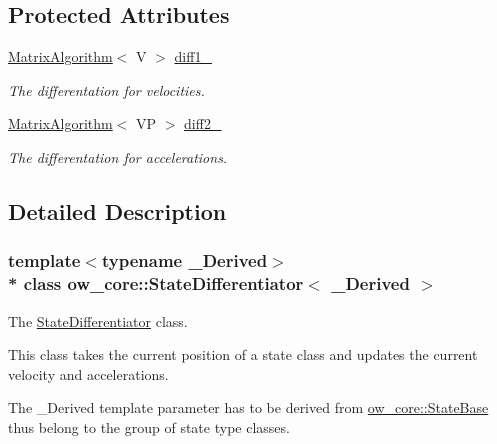 \subsection*{Protected Attributes}
\begin{DoxyCompactItemize}
\item 
\hyperlink{classow__core_1_1MatrixAlgorithm}{Matrix\+Algorithm}$<$ V $>$ \hyperlink{classow__core_1_1StateDifferentiator_ad428b0aed82b02f4db85574ede7be001}{diff1\+\_\+}\hypertarget{classow__core_1_1StateDifferentiator_ad428b0aed82b02f4db85574ede7be001}{}\label{classow__core_1_1StateDifferentiator_ad428b0aed82b02f4db85574ede7be001}

\begin{DoxyCompactList}\small\item\em The differentation for velocities. \end{DoxyCompactList}\item 
\hyperlink{classow__core_1_1MatrixAlgorithm}{Matrix\+Algorithm}$<$ VP $>$ \hyperlink{classow__core_1_1StateDifferentiator_a2f4097501a744ed53fce9e43e64106ec}{diff2\+\_\+}\hypertarget{classow__core_1_1StateDifferentiator_a2f4097501a744ed53fce9e43e64106ec}{}\label{classow__core_1_1StateDifferentiator_a2f4097501a744ed53fce9e43e64106ec}

\begin{DoxyCompactList}\small\item\em The differentation for accelerations. \end{DoxyCompactList}\end{DoxyCompactItemize}


\subsection{Detailed Description}
\subsubsection*{template$<$typename \+\_\+\+Derived$>$\\*
class ow\+\_\+core\+::\+State\+Differentiator$<$ \+\_\+\+Derived $>$}

The \hyperlink{classow__core_1_1StateDifferentiator}{State\+Differentiator} class. 

This class takes the current position of a state class and updates the current velocity and accelerations.

The \+\_\+\+Derived template parameter has to be derived from \hyperlink{classow__core_1_1StateBase}{ow\+\_\+core\+::\+State\+Base} thus belong to the group of state type classes. 

